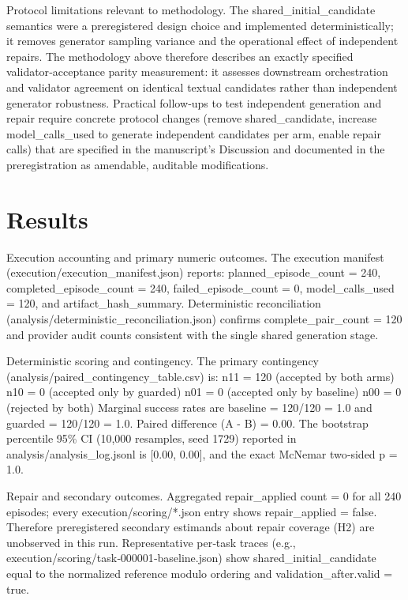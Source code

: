 \documentclass[conference]{IEEEtran}
\begin{document}
Protocol limitations relevant to methodology. The shared\_initial\_candidate semantics were a preregistered design choice and implemented deterministically; it removes generator sampling variance and the operational effect of independent repairs. The methodology above therefore describes an exactly specified validator‑acceptance parity measurement: it assesses downstream orchestration and validator agreement on identical textual candidates rather than independent generator robustness. Practical follow‑ups to test independent generation and repair require concrete protocol changes (remove shared\_candidate, increase model\_calls\_used to generate independent candidates per arm, enable repair calls) that are specified in the manuscript's Discussion and documented in the preregistration as amendable, auditable modifications.

\section{Results}
Execution accounting and primary numeric outcomes. The execution manifest (execution/execution\_manifest.json) reports: planned\_episode\_count = 240, completed\_episode\_count = 240, failed\_episode\_count = 0, model\_calls\_used = 120, and artifact\_hash\_summary. Deterministic reconciliation (analysis/deterministic\_reconciliation.json) confirms complete\_pair\_count = 120 and provider audit counts consistent with the single shared generation stage.

Deterministic scoring and contingency. The primary contingency (analysis/paired\_contingency\_table.csv) is:
\textbullet{} n11 = 120 (accepted by both arms)
\textbullet{} n10 = 0 (accepted only by guarded)
\textbullet{} n01 = 0 (accepted only by baseline)
\textbullet{} n00 = 0 (rejected by both)
Marginal success rates are baseline = 120/120 = 1.0 and guarded = 120/120 = 1.0. Paired difference (A - B) = 0.00. The bootstrap percentile 95\% CI (10,000 resamples, seed 1729) reported in analysis/analysis\_log.jsonl is [0.00, 0.00], and the exact McNemar two‑sided p = 1.0.

Repair and secondary outcomes. Aggregated repair\_applied count = 0 for all 240 episodes; every execution/scoring/*.json entry shows repair\_applied = false. Therefore preregistered secondary estimands about repair coverage (H2) are unobserved in this run. Representative per‑task traces (e.g., execution/scoring/task‑000001‑baseline.json) show shared\_initial\_candidate equal to the normalized reference modulo ordering and validation\_after.valid = true.
\end{document}
